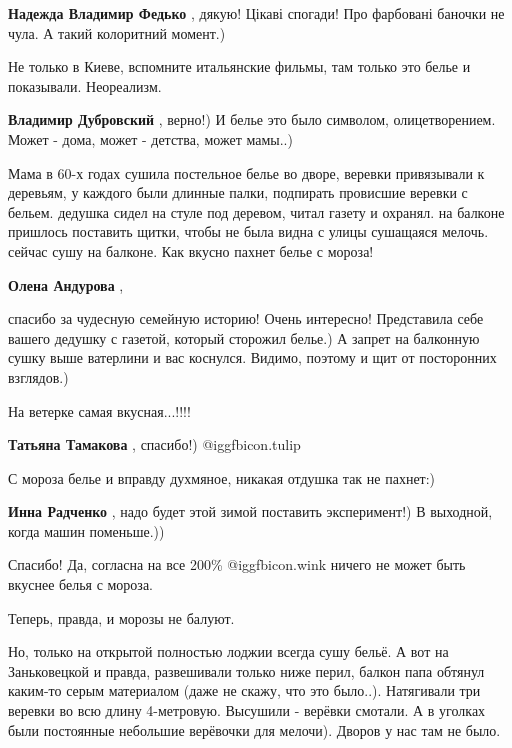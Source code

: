 \begin{itemize}
\begin{itemize} %
\textbf{Надежда Владимир Федько} , дякую! Цікаві спогади! Про фарбовані баночки не чула. А такий колоритний момент.)
\end{itemize} %

Не только в Киеве, вспомните итальянские фильмы, там только это белье и показывали. Неореализм.

\begin{itemize} %
\textbf{Владимир Дубровский} , верно!) И белье это было символом, олицетворением. Может - дома, может - детства, может мамы..)
\end{itemize} %


Мама в 60-х годах сушила постельное белье во дворе, веревки привязывали к
деревьям, у каждого были длинные палки, подпирать провисшие веревки с
бельем. дедушка сидел на стуле под деревом, читал газету и охранял. на балконе
пришлось поставить щитки, чтобы не была видна с улицы сушащаяся мелочь. сейчас
сушу на балконе. Как вкусно пахнет белье с мороза!

\begin{itemize} %
\textbf{Олена Андурова} , 

спасибо за чудесную семейную историю! Очень интересно! Представила себе вашего
дедушку с газетой, который сторожил белье.) А запрет на балконную сушку выше
ватерлини и вас коснулся. Видимо, поэтому и щит от посторонних взглядов.)

\end{itemize} %

На ветерке самая вкусная...!!!!

\textbf{Татьяна Тамакова} , спасибо!)  @igg{fbicon.tulip} 

С мороза белье и вправду духмяное, никакая отдушка так не пахнет:)

\textbf{Инна Радченко} , надо будет этой зимой поставить эксперимент!) В выходной, когда машин поменьше.))


Спасибо! Да, согласна на все 200\% @igg{fbicon.wink}  ничего не может быть вкуснее белья с мороза.

Теперь, правда, и морозы не балуют.

Но, только на открытой полностью лоджии всегда сушу бельё. А вот на
Заньковецкой и правда, развешивали только ниже перил, балкон папа обтянул
каким-то серым материалом (даже не скажу, что это было..). Натягивали три
веревки во всю длину 4-метровую. Высушили - верёвки смотали. А в уголках были
постоянные небольшие верёвочки для мелочи). Дворов у нас там не было.


\end{itemize} %
